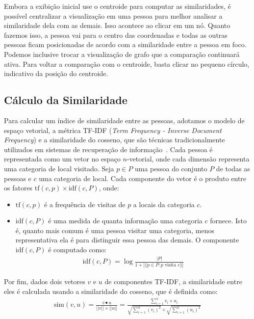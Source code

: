 \documentclass[12pt]{article}
\begin{document}
Embora a exibição inicial use o centroide para computar as similaridades, é possível centralizar a visualização em uma pessoa para melhor analisar a similaridade dela com as demais. Isso acontece ao clicar em um nó. Quanto fazemos isso, a pessoa vai para o centro das coordenadas e todas as outras pessoas ficam posicionadas de acordo com a similaridade entre a pessoa em foco. Podemos inclusive trocar a visualização de grafo que a comparação continuará ativa. Para voltar a comparação com o centroide, basta clicar no pequeno círculo, indicativo da posição do centroide.

\subsection{Cálculo da Similaridade}
\label{similaridade}

Para calcular um índice de similaridade entre as pessoas, adotamos o modelo de espaço vetorial, a métrica TF-IDF ({\em Term Frequency - Inverse Document Frequency}) e a similaridade do cosseno, que são técnicas tradicionalmente utilizados em sistemas de recuperação de informação~\cite{manning2008}. Cada pessoa é representada como um vetor no espaço $n$-vetorial, onde cada dimensão representa uma categoria de local visitado. Seja $p \in P$ uma pessoa do conjunto $P$ de todas as pessoas e $c$ uma categoria de local. Cada componente do vetor é o produto entre os fatores $\text{tf}(c, p) \times \text{idf}(c, P)$, onde:
\begin{itemize}
\item $\text{tf}(c, p)$ é a frequência de visitas de $p$ a locais da categoria $c$.
\item $\text{idf}(c, P)$ é uma medida de quanta informação uma categoria $c$ fornece. Isto é, quanto mais comum é uma pessoa visitar uma categoria, menos representativa ela é para distinguir essa pessoa das demais. O componente $\text{idf}(c, P)$ é computado como:
\begin{align*}
\text{idf}(c, P) = \log \frac{|P|}{1 + |\{p \in P : \text{$p$ visita $c$}  \}|}
\end{align*}
\end{itemize}

Por fim, dados dois vetores $v$ e $u$ de componentes TF-IDF, a similaridade entre eles é calculada usando a similaridade do cosseno, que é definida como:
\begin{align*}
\text{sim}(v, u) = \frac{v \bullet u}{||v|| \times ||u||} = \frac{\sum_{i=1}^{n} v_i \times u_i}{\sqrt{\sum_{i=1}^{n} (v_i)^2} \times \sqrt{\sum_{i=1}^{n} (u_i)^2}}
\end{align*}
\end{document}
